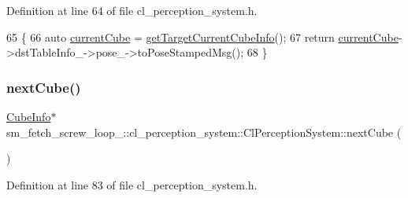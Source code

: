 Definition at line 64 of file cl\+\_\+perception\+\_\+system.\+h.


\begin{DoxyCode}
65             \{
66                 \textcolor{keyword}{auto} \hyperlink{classsm__fetch__screw__loop__1_1_1cl__perception__system_1_1ClPerceptionSystem_a6efb1a252a4cb0c5c7ce325c9021f374}{currentCube} = \hyperlink{classsm__fetch__screw__loop__1_1_1cl__perception__system_1_1ClPerceptionSystem_a7db81d4aa99849818668b52aee431816}{getTargetCurrentCubeInfo}();
67                 \textcolor{keywordflow}{return} \hyperlink{classsm__fetch__screw__loop__1_1_1cl__perception__system_1_1ClPerceptionSystem_a6efb1a252a4cb0c5c7ce325c9021f374}{currentCube}->dstTableInfo\_->pose\_->toPoseStampedMsg();
68             \}
\end{DoxyCode}
\mbox{\label{classsm__fetch__screw__loop__1_1_1cl__perception__system_1_1ClPerceptionSystem_a9035ba086c67f787377f796a49f3b8b7}} 
\subsubsection{\texorpdfstring{next\+Cube()}{nextCube()}}
{\footnotesize\ttfamily \hyperlink{structsm__fetch__screw__loop__1_1_1cl__perception__system_1_1CubeInfo}{Cube\+Info}$\ast$ sm\+\_\+fetch\+\_\+screw\+\_\+loop\+\_\+::cl\+\_\+perception\+\_\+system\+::\+Cl\+Perception\+System\+::next\+Cube (\begin{DoxyParamCaption}{ }\end{DoxyParamCaption})\hspace{0.3cm}{\ttfamily [inline]}}



Definition at line 83 of file cl\+\_\+perception\+\_\+system.\+h.


